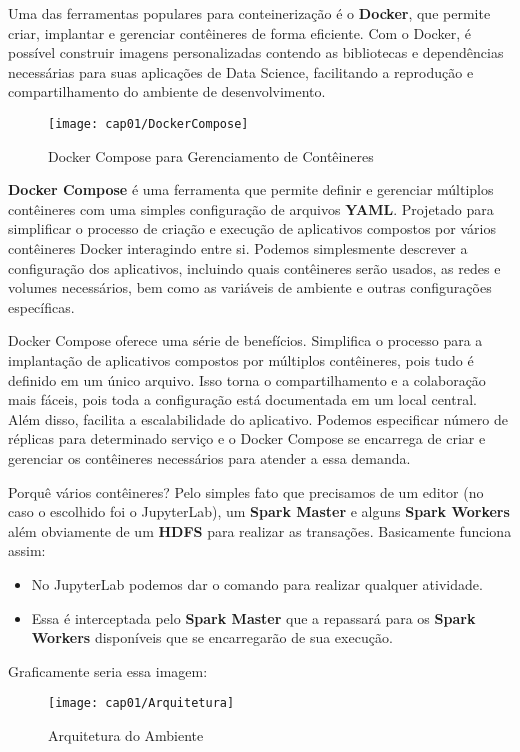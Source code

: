 Uma das ferramentas populares para conteinerização é o \textbf{Docker}, que permite criar, implantar e gerenciar contêineres de forma eficiente. Com o Docker, é possível construir imagens personalizadas contendo as bibliotecas e dependências necessárias para suas aplicações de Data Science, facilitando a reprodução e compartilhamento do ambiente de desenvolvimento.
\begin{figure}[H]
 \centering\texttt{[image: cap01/DockerCompose]}
 \caption{Docker Compose para Gerenciamento de Contêineres}
\end{figure}

\textbf{Docker Compose} é uma ferramenta que permite definir e gerenciar múltiplos contêineres com uma simples configuração de arquivos \textbf{YAML}. Projetado para simplificar o processo de criação e execução de aplicativos compostos por vários contêineres Docker interagindo entre si. Podemos simplesmente descrever a configuração dos aplicativos, incluindo quais contêineres serão usados, as redes e volumes necessários, bem como as variáveis de ambiente e outras configurações específicas.

Docker Compose oferece uma série de benefícios. Simplifica o processo para a implantação de aplicativos compostos por múltiplos contêineres, pois tudo é definido em um único arquivo. Isso torna o compartilhamento e a colaboração mais fáceis, pois toda a configuração está documentada em um local central. Além disso, facilita a escalabilidade do aplicativo. Podemos especificar número de réplicas para determinado serviço e o Docker Compose se encarrega de criar e gerenciar os contêineres necessários para atender a essa demanda.

Porquê vários contêineres? Pelo simples fato que precisamos de um editor (no caso o escolhido foi o JupyterLab), um \textbf{Spark Master} e alguns \textbf{Spark Workers} além obviamente de um \textbf{HDFS} para realizar as transações. Basicamente funciona assim:
\begin{itemize} \vspace{-1em}
  \item No JupyterLab podemos dar o comando para realizar qualquer atividade.
  \item Essa é interceptada pelo \textbf{Spark Master} que a repassará para os \textbf{Spark Workers} disponíveis que se encarregarão de sua execução.
\end{itemize}

Graficamente seria essa imagem:
\begin{figure}[H]
	\centering\texttt{[image: cap01/Arquitetura]}
	\caption{Arquitetura do Ambiente}
\end{figure}

